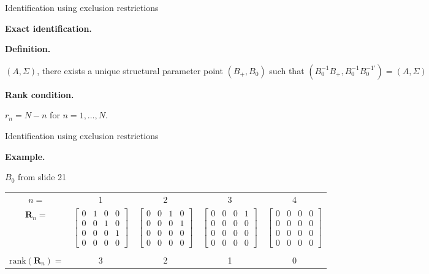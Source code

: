 \documentclass[notes,blackandwhite,mathsans,usenames,dvipsnames]{beamer}
\begin{document}
\begin{frame}{Identification using exclusion restrictions}

\textbf{Exact identification.}


\bigskip\textbf{Definition.}

 $(A,\Sigma)${\color{mcxs2}, there exists a unique structural parameter point} $(B_+,B_0)$ {\color{mcxs2}such that} $\left(B_0^{-1}B_+, B_0^{-1}B_0^{-1\prime}\right)= (A,\Sigma)$


\bigskip\textbf{Rank condition.}

 $r_n = N-n$ {\color{mcxs2}for} $n=1,\dots,N$.

\end{frame}



\begin{frame}{Identification using exclusion restrictions}

\textbf{Example.}

 $B_0$ {\color{mcxs2}from slide 21}
\scriptsize
\begin{center}
\begin{tabular}{ccccc}
$n=$&1&2&3&4\\[2ex]
$\mathbf{R}_n=$&$\begin{bmatrix} 0&1&0&0\\0&0&1&0\\0&0&0&1\\0&0&0&0 \end{bmatrix}$&
$\begin{bmatrix} 0&0&1&0\\0&0&0&1\\0&0&0&0\\0&0&0&0 \end{bmatrix}$&
$\begin{bmatrix} 0&0&0&1\\0&0&0&0\\0&0&0&0\\0&0&0&0 \end{bmatrix}$&
$\begin{bmatrix} 0&0&0&0\\0&0&0&0\\0&0&0&0\\0&0&0&0 \end{bmatrix}$\\
&&&&\\
$\text{rank}(\mathbf{R}_n)=$&3&2&1&0
\end{tabular}
\end{center}

\normalsize
{}

\end{frame}
\end{document}

